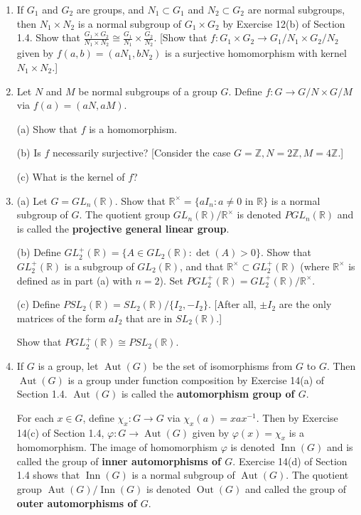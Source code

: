 \documentclass[leqno]{book}
\begin{document}
\begin{enumerate}
\item If $G_1$ and $G_2$ are groups, and $N_1\subset G_1$ and $N_2\subset G_2$ are normal subgroups, then $N_1\times N_2$ is a normal subgroup of $G_1\times G_2$ by Exercise 12(b) of Section 1.4.  Show that $\frac{G_1\times G_2}{N_1\times N_2}\cong\frac{G_1}{N_1}\times\frac{G_2}{N_2}$.  [Show that $f:G_1\times G_2\to G_1/N_1\times G_2/N_2$ given by $f(a,b)=(aN_1,bN_2)$ is a surjective homomorphism with kernel $N_1\times N_2$.]

\item Let $N$ and $M$ be normal subgroups of a group $G$.  Define $f:G\to G/N\times G/M$ via $f(a)=(aN,aM)$.

(a) Show that $f$ is a homomorphism.

(b) Is $f$ necessarily surjective?  [Consider the case $G=\mathbb Z,N=2\mathbb Z,M=4\mathbb Z$.]

(c) What is the kernel of $f$?

\item (a) Let $G=GL_n(\mathbb R)$.  Show that $\mathbb R^\times=\{aI_n:a\ne 0\text{ in }\mathbb R\}$ is a normal subgroup of $G$.  The quotient group $GL_n(\mathbb R)/\mathbb R^\times$ is denoted $PGL_n(\mathbb R)$ and is called the \textbf{projective general linear group}.

(b) Define $GL^+_2(\mathbb R)=\{A\in GL_2(\mathbb R):\det(A)>0\}$.  Show that $GL^+_2(\mathbb R)$ is a subgroup of $GL_2(\mathbb R)$, and that $\mathbb R^\times\subset GL^+_2(\mathbb R)$ (where $\mathbb R^\times$ is defined as in part (a) with $n=2$).  Set $PGL^+_2(\mathbb R)=GL^+_2(\mathbb R)/\mathbb R^\times$.

(c) Define $PSL_2(\mathbb R)=SL_2(\mathbb R)/\{I_2,-I_2\}$.  [After all, $\pm I_2$ are the only matrices of the form $aI_2$ that are in $SL_2(\mathbb R)$.]

Show that $PGL^+_2(\mathbb R)\cong PSL_2(\mathbb R)$.

\item If $G$ is a group, let $\operatorname{Aut}(G)$ be the set of isomorphisms from $G$ to $G$.  Then $\operatorname{Aut}(G)$ is a group under function composition by Exercise 14(a) of Section 1.4.  $\operatorname{Aut}(G)$ is called the \textbf{automorphism group of $G$}.

For each $x\in G$, define $\chi_x:G\to G$ via $\chi_x(a)=xax^{-1}$.  Then by Exercise 14(c) of Section 1.4, $\varphi:G\to\operatorname{Aut}(G)$ given by $\varphi(x)=\chi_x$ is a homomorphism.  The image of homomorphism $\varphi$ is denoted $\operatorname{Inn}(G)$ and is called the group of \textbf{inner automorphisms of $G$}.  Exercise 14(d) of Section 1.4 shows that $\operatorname{Inn}(G)$ is a normal subgroup of $\operatorname{Aut}(G)$.  The quotient group $\operatorname{Aut}(G)/\operatorname{Inn}(G)$ is denoted $\operatorname{Out}(G)$ and called the group of \textbf{outer automorphisms of $G$}.


\end{enumerate}
\end{document}
